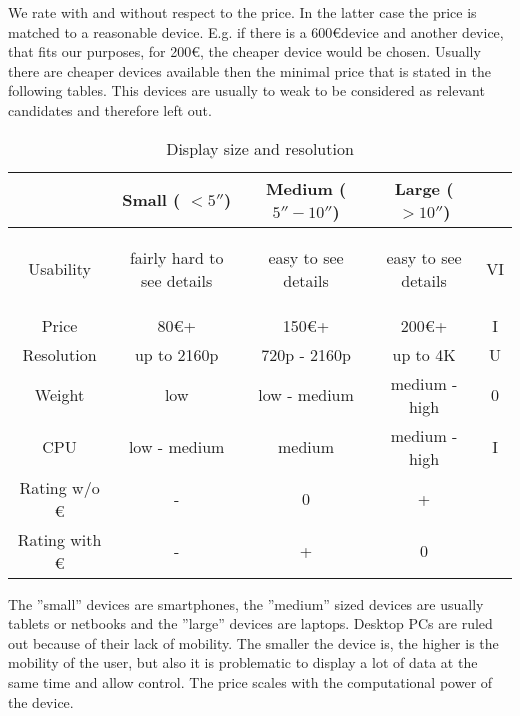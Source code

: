 \documentclass[]{scrreprt}
\begin{document}
	We rate with and without respect to the price. In the latter case the price is matched to a reasonable device. E.g. if there is a 600\euro device and another device, that fits our purposes, for 200\euro, the cheaper device would be chosen. Usually there are cheaper devices available then the minimal price that is stated in the following tables. This devices are usually to weak to be considered as relevant candidates and therefore left out.

	\begin{table}[H]
		\caption {Display size and resolution} \label{tab:DSAR}
		\centering
	\begin{tabular}{|c||c|c|c|c|}
		\hline 
		& Small ( $< 5''$) & Medium ( $5'' - 10''$) & Large ( $> 10''$) & \\ 
		\hline \hline
		Usability & \begin{pbox}{3.0cm}{\vspace{.2\baselineskip}fairly hard to see details\vspace{.3\baselineskip}}\end{pbox} & \begin{pbox}{2.0cm}{\vspace{.2\baselineskip}easy to see details\vspace{.3\baselineskip}}\end{pbox} & \begin{pbox}{2.0cm}{\vspace{.2\baselineskip}easy to see details\vspace{.3\baselineskip}}\end{pbox} & VI\\
		\hline 
		Price & $80$\euro+ & 150\euro+ & 200\euro+ & I \\  
		\hline 
		Resolution & up to 2160p & 720p - 2160p & up to 4K & U\\ 
		\hline 
		Weight & low & low - medium & medium - high & 0\\ 
		\hline
		CPU & low - medium & medium & medium - high & I \\
		\hline \hline
		Rating w/o \euro& - & 0 & +& \\
		\hline
		Rating with \euro& - & + & 0&\\
		\hline
	\end{tabular}
	\end{table}

	The ''small'' devices are smartphones, the ''medium'' sized devices are usually tablets or netbooks and the ''large'' devices are laptops. Desktop PCs are ruled out because of their lack of mobility. The smaller the device is, the higher is the mobility of the user, but also it is problematic to display a lot of data at the same time and allow control. The price scales with the computational power of the device.
\end{document}
